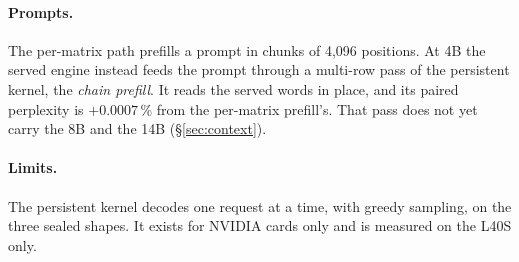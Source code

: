\paragraph{Prompts.} The per-matrix path prefills a prompt in chunks of
4{,}096 positions. At 4B the served engine instead feeds the prompt through a
multi-row pass of the persistent kernel, the \emph{chain prefill}. It reads
the served words in place, and its paired perplexity is $+0.0007\,\%$ from the
per-matrix prefill's. That pass does not yet carry the 8B and the 14B
(\S\ref{sec:context}).

\paragraph{Limits.} The persistent kernel decodes one request at a time, with
greedy sampling, on the three sealed shapes. It exists for NVIDIA cards only
and is measured on the L40S only.
